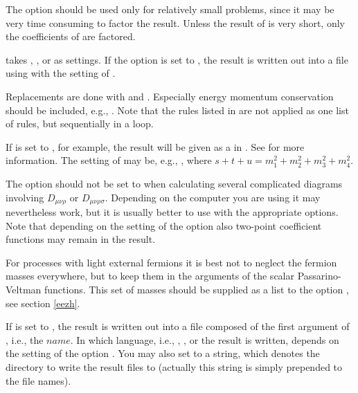 The  option should be used only for relatively small problems, since it may 
be very time consuming to factor the result. Unless the result of  is 
very short, only 
the coefficients of  are factored.

 takes , ,  or 
as settings. If the option  is set to , the result is written out 
into a file using  with the setting of .

Replacements are  
done with  and .
Especially energy momentum conservation should be included, e.g., 
.
Note that the rules listed in  are not applied as one list of rules, 
but sequentially in a loop.

If  is set to , for example, the result will be given as
a  in . See  for more information.
The setting of  may be, e.g., 
, where  $s + t + u = m_1^2 + m_2^2 + m_3^2 + m_4^2$.

The option  should not be set to  when calculating several complicated diagrams involving $D_{\mu \nu \rho}$ or $D_{\mu \nu \rho \sigma}$. 
Depending on the computer you are using  it may nevertheless work, but it is usually better 
to use  with the appropriate options. Note that depending on the setting of the 
option  also two-point coefficient functions may remain in the result.

For processes with light external fermions it is best not to neglect the fermion masses
everywhere, but to keep them in the arguments of the scalar Passarino-Veltman functions.
This set of masses should be supplied as a list to the option , see section \ref{eezh}. 

If  is set to , the result is written out into a file composed of the first
argument of , i.e., the $name$. In which language, i.e., 
\mma, ,  or  the result is written, depends on the setting of the option .
You may also set  to a string, which denotes the directory 
to write the result files to (actually this string is simply prepended to the file names).

